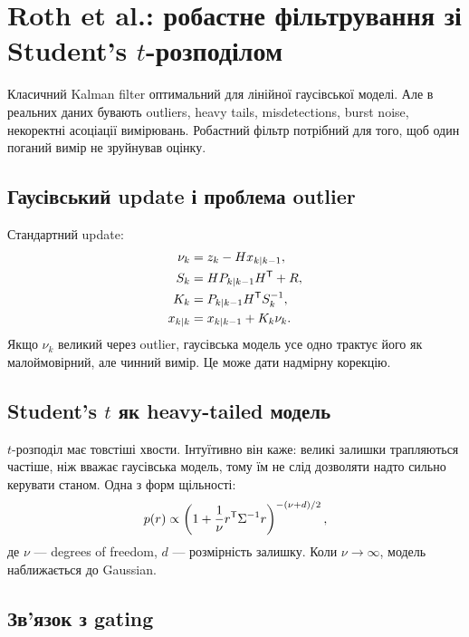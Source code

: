 \chapter{Roth et al.: робастне фільтрування зі Student's \texorpdfstring{$t$}{t}-розподілом}
\label{chap:roth-robust-filtering}


Класичний Kalman filter оптимальний для лінійної гаусівської моделі. Але в реальних даних бувають outliers, heavy tails, misdetections, burst noise, некоректні асоціації вимірювань. Робастний фільтр потрібний для того, щоб один поганий вимір не зруйнував оцінку.

\section{Гаусівський update і проблема outlier}

Стандартний update:
\begin{align}
  \nu_k &= z_k-Hx_{k|k-1},\\
  S_k &= HP_{k|k-1}H^{\mathsf{T}}+R,\\
  K_k &= P_{k|k-1}H^{\mathsf{T}} S_k^{-1},\\
  x_{k|k} &= x_{k|k-1}+K_k\nu_k.
\end{align}
Якщо $\nu_k$ великий через outlier, гаусівська модель усе одно трактує його як малоймовірний, але чинний вимір. Це може дати надмірну корекцію.

\section{Student's \texorpdfstring{$t$}{t} як heavy-tailed модель}

$t$-розподіл має товстіші хвости. Інтуїтивно він каже: великі залишки трапляються частіше, ніж вважає гаусівська модель, тому їм не слід дозволяти надто сильно керувати станом. Одна з форм щільності:
\begin{equation}
  p(r)\propto \left(1+\frac{1}{\nu}r^{\mathsf{T}}\Sigma^{-1}r\right)^{-(\nu+d)/2},
\end{equation}
де $\nu$ --- degrees of freedom, $d$ --- розмірність залишку. Коли $\nu\to\infty$, модель наближається до Gaussian.

\section{Зв'язок з gating}

